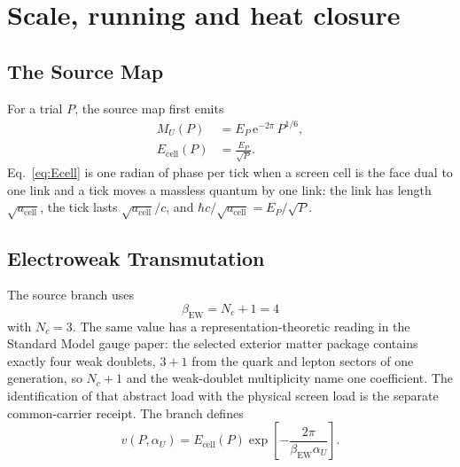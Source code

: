 \documentclass[11pt]{article}
\theoremstyle{remark}
\newcommand{\e}{\mathrm e}
\newcommand{\Nc}{N_c}
\begin{document}
\section{Scale, running and heat closure}
\subsection{The Source Map}
\label{sec:alpha-step-7}

For a trial \(P\), the source map first emits
\begin{align}
M_U(P)&=E_P\,\e^{-2\pi}\,P^{1/6},
\label{eq:MU}\\
E_{\mathrm{cell}}(P)&=\frac{E_P}{\sqrt P}.
\label{eq:Ecell}
\end{align}
Eq.~\eqref{eq:Ecell} is one radian of phase per tick when a screen cell is the
face dual to one link and a tick moves a massless quantum by one link: the link
has length \(\sqrt{a_{\mathrm{cell}}}\), the tick lasts
\(\sqrt{a_{\mathrm{cell}}}/c\), and
\(\hbar c/\sqrt{a_{\mathrm{cell}}}=E_P/\sqrt P\).


\subsection{Electroweak Transmutation}
\label{sec:alpha-step-8}

The source branch uses
\begin{equation}
\beta_{\mathrm{EW}}=\Nc+1=4
\end{equation}
with \(\Nc=3\). The same value has a representation-theoretic reading in the
Standard Model gauge paper: the selected exterior matter package contains exactly four weak
doublets, \(3+1\) from the quark and lepton sectors of one generation, so
\(\Nc+1\) and the weak-doublet multiplicity name one coefficient. The
identification of that abstract load with the physical screen load is the
separate common-carrier receipt. The branch defines
\begin{equation}
v(P,\alpha_U)
=
E_{\mathrm{cell}}(P)
\exp\!\left[-\frac{2\pi}{\beta_{\mathrm{EW}}\alpha_U}\right].
\label{eq:v}
\end{equation}
\end{document}
